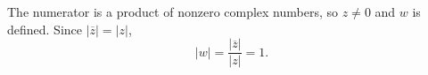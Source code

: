 The numerator is a product of nonzero complex numbers, so $z\ne0$ and $w$ is defined. Since $\left|\overline z\right|=|z|$,
\[|w|=\dfrac{\left|\overline z\right|}{|z|}=\boxed{1}.\]
